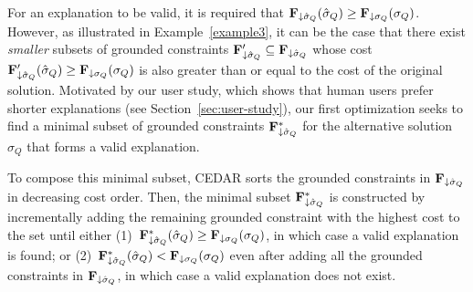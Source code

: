\documentclass[twoside,11pt]{article}
\begin{document}


 For an explanation to be valid, it is required that ${\bf{F}}_{\downarrow \hat{\sigma}_Q}(\hat{\sigma}_Q) \geq {\bf{F}}_{\downarrow \sigma_Q}(\sigma_Q)$. However, as illustrated in Example~\ref{example3}, it can be the case that there exist \emph{smaller} subsets of grounded constraints ${\bf{F}}'_{\downarrow \hat{\sigma}_Q} \subseteq {\bf{F}}_{\downarrow \hat{\sigma}_Q}$ whose cost ${\bf{F}}'_{\downarrow \hat{\sigma}_Q}(\hat{\sigma}_Q) \geq {\bf{F}}_{\downarrow \sigma_Q}(\sigma_Q)$ is also greater than or equal to the cost of the original solution. Motivated by our user study, which shows that human users prefer shorter explanations (see Section~\ref{sec:user-study}), our first optimization seeks to find a minimal subset of grounded constraints ${\bf{F}}^*_{\downarrow \hat{\sigma}_Q}$ for the alternative solution $\hat{\sigma}_Q$ that forms a valid explanation.

To compose this minimal subset, CEDAR sorts the grounded constraints in ${\bf{F}}_{\downarrow \hat{\sigma}_Q}$ in decreasing cost order. Then, the minimal subset ${\bf{F}}^*_{\downarrow \hat{\sigma}_Q}$ is constructed by incrementally adding the remaining grounded constraint with the highest cost to the set until either (1)~${\bf{F}}^*_{\downarrow \hat{\sigma}_Q}(\hat{\sigma}_Q) \geq {\bf{F}}_{\downarrow \sigma_Q}(\sigma_Q)$, in which case a valid explanation is found; or (2)~${\bf{F}}^*_{\downarrow \hat{\sigma}_Q}(\hat{\sigma}_Q) < {\bf{F}}_{\downarrow \sigma_Q}(\sigma_Q)$ even after adding all the grounded constraints in ${\bf{F}}_{\downarrow \hat{\sigma}_Q}$, in which case a valid explanation does not exist. 
\end{document}
